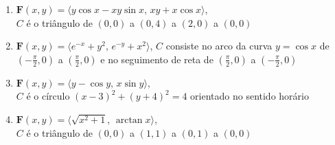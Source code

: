 	\begin{enumerate}[resume]

		\item $\textbf{F}(x,y) = \langle y\cos{x} - xy\sin{x}, \, xy + x\cos{x} \rangle$, \\ $C$ é o triângulo de $(0,0)$ a $(0,4)$ a $(2,0)$ a $(0,0)$

		\item $\textbf{F}(x,y) = \langle e^{-x} + y^2, \, e^{-y} + x^2 \rangle$, \quad $C$ consiste no arco da curva $y = \cos x$ de $(-\frac{\pi}{2},0)$ a $(\frac{\pi}{2},0)$ e no seguimento de reta de $(\frac{\pi}{2},0)$ a $(-\frac{\pi}{2},0)$

		\item $\textbf{F}(x,y) = \langle y - \cos{y}, \, x\sin{y} \rangle$, \\ $C$ é o círculo $(x-3)^2 + (y+4)^2 = 4$ orientado no sentido horário
		\resposta{$4\pi$}

		\item $\textbf{F}(x,y) = \langle \sqrt{x^2 + 1}, \, \arctan{x} \rangle$, \\ $C$ é o triângulo de $(0,0)$ a $(1,1)$ a $(0,1)$ a $(0,0)$
	
	\end{enumerate}
		
	\vspace{5mm}	
	
	


